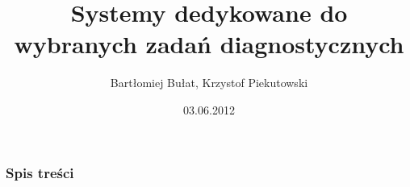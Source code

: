 \documentclass{beamer}
\title[Systemy dedykowane do wybranych zadań diagnostycznych]{Systemy dedykowane do wybranych zadań diagnostycznych}
\author[B. Bułat, K. Piekutowski]{Bartłomiej Bułat, Krzystof Piekutowski}
\date[2012]{03.06.2012}
\institute[AGH]
{Wydział EAIiE\\ 
Katedra Automatyki
}
\begin{document}
{
 \begin{frame}
   \titlepage
 \end{frame}
}


\begin{frame}
  \frametitle{Spis treści}
  \tableofcontents[hidesubsections]
\end{frame}

\newcommand{\nextoc}{%
  \begin{frame}\frametitle{Spis treści}\tableofcontents[hidesubsections]\end{frame}}

\end{document}

